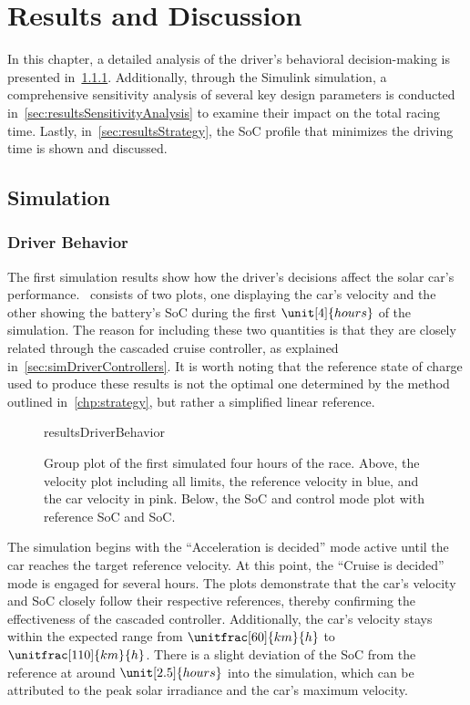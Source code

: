 
\chapter{Results and Discussion}
\label{chp:results}
In this chapter, a detailed analysis of the driver's behavioral decision-making is presented in~\cref{sec:resultsDriverBehavior}. Additionally, through the Simulink simulation, a comprehensive sensitivity analysis of several key design parameters is conducted in~\cref{sec:resultsSensitivityAnalysis} to examine their impact on the total racing time. Lastly, in~\cref{sec:resultsStrategy}, the SoC profile that minimizes the driving time is shown and discussed.


\section{Simulation}
\subsection{Driver Behavior}
\label{sec:resultsDriverBehavior}
The first simulation results show how the driver's decisions affect the solar car's performance.~ consists of two plots, one displaying the car's velocity and the other showing the battery's SoC during the first $\unit[4]{hours}$ of the simulation. The reason for including these two quantities is that they are closely related through the cascaded cruise controller, as explained in~\cref{sec:simDriverControllers}. It is worth noting that the reference state of charge used to produce these results is not the optimal one determined by the method outlined in~\ref{chp:strategy}, but rather a simplified linear reference.
\begin{sidewaysfigure}[htbp]
	\centering
	\begin{externalize}{resultsDriverBehavior}
		
	\end{externalize}
	\caption{Group plot of the first simulated four hours of the race. Above, the velocity plot including all limits, the reference velocity in blue, and the car velocity in pink. Below, the SoC and control mode plot with reference SoC and SoC.}
	\label{fig:resultsDriverBehavior}
\end{sidewaysfigure}

The simulation begins with the \enquote{Acceleration is decided} mode active until the car reaches the target reference velocity. At this point, the \enquote{Cruise is decided} mode is engaged for several hours. The plots demonstrate that the car's velocity and SoC closely follow their respective references, thereby confirming the effectiveness of the cascaded controller. Additionally, the car's velocity stays within the expected range from $\unitfrac[60]{km}{h}$ to $\unitfrac[110]{km}{h}$. There is a slight deviation of the SoC from the reference at around $\unit[2.5]{hours}$ into the simulation, which can be attributed to the peak solar irradiance and the car's maximum velocity.

